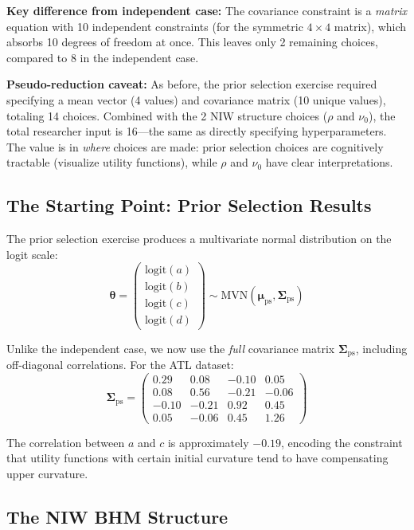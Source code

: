 \documentclass[11pt]{article}
\begin{document}
\textbf{Key difference from independent case:} The covariance constraint is a \textit{matrix} equation with 10 independent constraints (for the symmetric $4 \times 4$ matrix), which absorbs 10 degrees of freedom at once. This leaves only 2 remaining choices, compared to 8 in the independent case.

\textbf{Pseudo-reduction caveat:} As before, the prior selection exercise required specifying a mean vector (4 values) and covariance matrix (10 unique values), totaling 14 choices. Combined with the 2 NIW structure choices ($\rho$ and $\nu_0$), the total researcher input is 16---the same as directly specifying hyperparameters. The value is in \textit{where} choices are made: prior selection choices are cognitively tractable (visualize utility functions), while $\rho$ and $\nu_0$ have clear interpretations.

\subsection{The Starting Point: Prior Selection Results}

The prior selection exercise produces a multivariate normal distribution on the logit scale:
\[
  \boldsymbol{\theta} = \begin{pmatrix} \text{logit}(a) \\ \text{logit}(b) \\ \text{logit}(c) \\ \text{logit}(d) \end{pmatrix}
  \sim \text{MVN}(\boldsymbol{\mu}_{\text{ps}}, \boldsymbol{\Sigma}_{\text{ps}})
\]

Unlike the independent case, we now use the \textit{full} covariance matrix $\boldsymbol{\Sigma}_{\text{ps}}$, including off-diagonal correlations. For the ATL dataset:
\[
  \boldsymbol{\Sigma}_{\text{ps}} = \begin{pmatrix}
    0.29 & 0.08 & -0.10 & 0.05 \\
    0.08 & 0.56 & -0.21 & -0.06 \\
    -0.10 & -0.21 & 0.92 & 0.45 \\
    0.05 & -0.06 & 0.45 & 1.26
  \end{pmatrix}
\]

The correlation between $a$ and $c$ is approximately $-0.19$, encoding the constraint that utility functions with certain initial curvature tend to have compensating upper curvature.

\subsection{The NIW BHM Structure}
\end{document}
